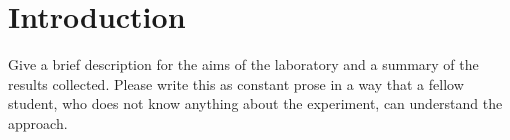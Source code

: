 \section{Introduction}
\label{sec:introduction}
Give a brief description for the aims of the laboratory and a summary of the results collected.
Please write this as constant prose in a way that a fellow student,
who does not know anything about the experiment,
can understand the approach.